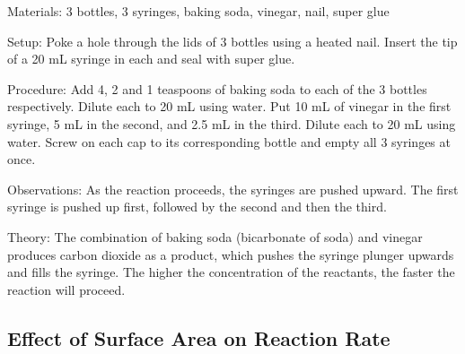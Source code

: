 \begin{multicols}{2}

\begin{description*}
\item[Materials:]{3 bottles, 3 syringes, baking soda, vinegar, nail, super glue}
\item[Setup:]{Poke a hole through the lids of 3 bottles using a heated nail. Insert the tip of a 20 mL syringe in each and seal with super glue.}
\item[Procedure:]{Add 4, 2 and 1 teaspoons of baking soda to each of the 3 bottles respectively. Dilute each to 20 mL using water. Put 10 mL of vinegar in the first syringe, 5 mL in the second, and 2.5 mL in the third. Dilute each to 20 mL using water. Screw on each cap to its corresponding bottle and empty all 3 syringes at once.}
\item[Observations:]{As the reaction proceeds, the syringes are pushed upward. The first syringe is pushed up first, followed by the second and then the third.}
\item[Theory:]{The combination of baking soda (bicarbonate of soda) and vinegar produces carbon dioxide as a product, which pushes the syringe plunger upwards and fills the syringe. The higher the concentration of the reactants, the faster the reaction will proceed.}
\end{description*}

\subsection{Effect of Surface Area on Reaction Rate}



\end{multicols}
